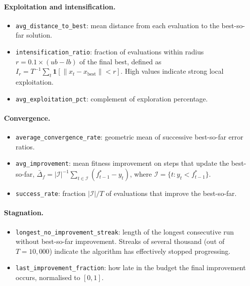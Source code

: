 \paragraph{Exploitation and intensification.}
\begin{itemize}
  \item \texttt{avg\_distance\_to\_best}: mean distance from each evaluation to the best-so-far solution.
  \item \texttt{intensification\_ratio}: fraction of evaluations within radius $r = 0.1 \times (\mathit{ub} - \mathit{lb})$ of the final best, defined as $I_r = T^{-1}\sum_{t}\mathbf{1}[\lVert x_t - x_{\mathrm{best}} \rVert < r]$. High values indicate strong local exploitation.
  \item \texttt{avg\_exploitation\_pct}: complement of exploration percentage.
\end{itemize}

\paragraph{Convergence.}
\begin{itemize}
  \item \texttt{average\_convergence\_rate}: geometric mean of successive best-so-far error ratios.
  \item \texttt{avg\_improvement}: mean fitness improvement on steps that update the best-so-far, $\bar{\Delta}_f = |\mathcal{I}|^{-1}\sum_{t \in \mathcal{I}}(f^*_{t-1} - y_t)$, where $\mathcal{I} = \{t : y_t < f^*_{t-1}\}$.
  \item \texttt{success\_rate}: fraction $|\mathcal{I}| / T$ of evaluations that improve the best-so-far.
\end{itemize}

\paragraph{Stagnation.}
\begin{itemize}
  \item \texttt{longest\_no\_improvement\_streak}: length of the longest consecutive run without best-so-far improvement. Streaks of several thousand (out of $T = 10{,}000$) indicate the algorithm has effectively stopped progressing.
  \item \texttt{last\_improvement\_fraction}: how late in the budget the final improvement occurs, normalised to $[0, 1]$.
\end{itemize}

